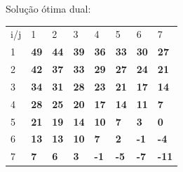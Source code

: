 \documentclass[11pt]{article} %
\begin{document}
Solução ótima dual:
\begin{table}[h]
\centering
\begin{tabular}{llllllll}
i/j                    & 1                                & 2                                & 3                                & 4                                & 5                                & 6                                & 7                                 \\ \cline{2-8} 
\multicolumn{1}{l|}{1} & \multicolumn{1}{l|}{\textbf{49}}  & \multicolumn{1}{l|}{\textbf{44}} & \multicolumn{1}{l|}{\textbf{39}} & \multicolumn{1}{l|}{\textbf{36}} & \multicolumn{1}{l|}{\textbf{33}} & \multicolumn{1}{l|}{\textbf{30}} & \multicolumn{1}{l|}{\textbf{27}}  \\ \cline{2-8} 
\multicolumn{1}{l|}{2} & \multicolumn{1}{l|}{\textbf{42}} & \multicolumn{1}{l|}{\textbf{37}} & \multicolumn{1}{l|}{\textbf{33}} & \multicolumn{1}{l|}{\textbf{29}} & \multicolumn{1}{l|}{\textbf{27}} & \multicolumn{1}{l|}{\textbf{24}} & \multicolumn{1}{l|}{\textbf{21}}  \\ \cline{2-8} 
\multicolumn{1}{l|}{3} & \multicolumn{1}{l|}{\textbf{34}} & \multicolumn{1}{l|}{\textbf{31}} & \multicolumn{1}{l|}{\textbf{28}} & \multicolumn{1}{l|}{\textbf{23}} & \multicolumn{1}{l|}{\textbf{21}} & \multicolumn{1}{l|}{\textbf{17}} & \multicolumn{1}{l|}{\textbf{14}}  \\ \cline{2-8} 
\multicolumn{1}{l|}{4} & \multicolumn{1}{l|}{\textbf{28}} & \multicolumn{1}{l|}{\textbf{25}} & \multicolumn{1}{l|}{\textbf{20}} & \multicolumn{1}{l|}{\textbf{17}} & \multicolumn{1}{l|}{\textbf{14}} & \multicolumn{1}{l|}{\textbf{11}} & \multicolumn{1}{l|}{\textbf{7}}   \\ \cline{2-8} 
\multicolumn{1}{l|}{5} & \multicolumn{1}{l|}{\textbf{21}} & \multicolumn{1}{l|}{\textbf{19}} & \multicolumn{1}{l|}{\textbf{14}} & \multicolumn{1}{l|}{\textbf{10}} & \multicolumn{1}{l|}{\textbf{7}}  & \multicolumn{1}{l|}{\textbf{3}}  & \multicolumn{1}{l|}{\textbf{0}}   \\ \cline{2-8} 
\multicolumn{1}{l|}{6} & \multicolumn{1}{l|}{\textbf{13}} & \multicolumn{1}{l|}{\textbf{13}} & \multicolumn{1}{l|}{\textbf{10}} & \multicolumn{1}{l|}{\textbf{7}}  & \multicolumn{1}{l|}{\textbf{2}}  & \multicolumn{1}{l|}{\textbf{-1}} & \multicolumn{1}{l|}{\textbf{-4}}  \\ \cline{2-8} 
\multicolumn{1}{l|}{7} & \multicolumn{1}{l|}{\textbf{7}}  & \multicolumn{1}{l|}{\textbf{6}}  & \multicolumn{1}{l|}{\textbf{3}}  & \multicolumn{1}{l|}{\textbf{-1}} & \multicolumn{1}{l|}{\textbf{-5}} & \multicolumn{1}{l|}{\textbf{-7}} & \multicolumn{1}{l|}{\textbf{-11}} \\ \cline{2-8} 
\end{tabular}
\end{table}
\end{document}
